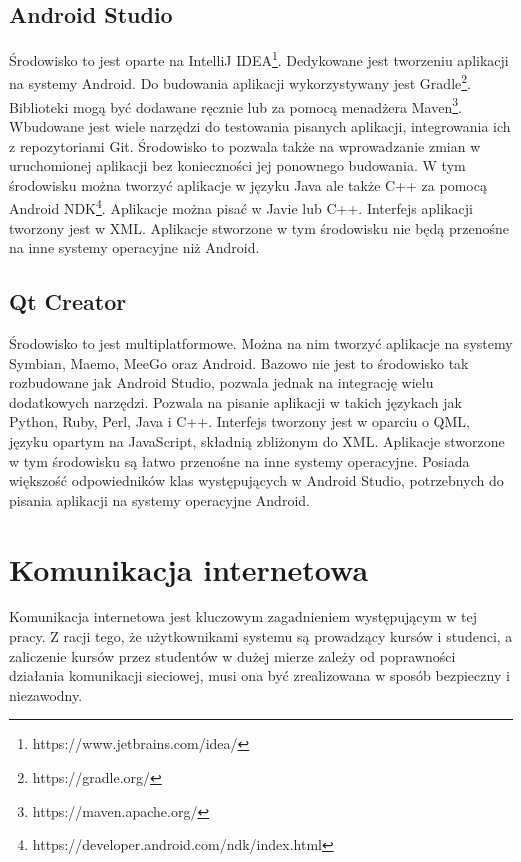 \documentclass[eng]{mgr}
\begin{document}
			\subsection{Android Studio}
			Środowisko to jest oparte na IntelliJ IDEA\footnote{https://www.jetbrains.com/idea/}. Dedykowane jest tworzeniu aplikacji na systemy Android. Do budowania aplikacji wykorzystywany jest Gradle\footnote{https://gradle.org/}. Biblioteki mogą być dodawane ręcznie lub za pomocą menadżera Maven\footnote{https://maven.apache.org/}. Wbudowane jest wiele narzędzi do testowania pisanych aplikacji, integrowania ich z repozytoriami Git. Środowisko to pozwala także na wprowadzanie zmian w uruchomionej aplikacji bez konieczności jej ponownego budowania. W tym środowisku można tworzyć aplikacje w języku Java ale także C++ za pomocą Android NDK\footnote{https://developer.android.com/ndk/index.html}. Aplikacje można pisać w Javie lub C++. Interfejs aplikacji tworzony jest w XML. Aplikacje stworzone w tym środowisku nie będą przenośne na inne systemy operacyjne niż Android.
			
			\subsection{Qt Creator}
			Środowisko to jest multiplatformowe. Można na nim tworzyć aplikacje na systemy Symbian, Maemo, MeeGo oraz Android. Bazowo nie jest to środowisko tak rozbudowane jak Android Studio, pozwala jednak na integrację wielu dodatkowych narzędzi. Pozwala na pisanie aplikacji w takich językach jak Python, Ruby, Perl, Java i C++. Interfejs tworzony jest w oparciu o QML, języku opartym na JavaScript, składnią zbliżonym do XML. Aplikacje stworzone w tym środowisku są łatwo przenośne na inne systemy operacyjne. Posiada większość odpowiedników klas występujących w Android Studio, potrzebnych do pisania aplikacji na systemy operacyjne Android.
	
		\section{Komunikacja internetowa}
		Komunikacja internetowa jest kluczowym zagadnieniem występującym w tej pracy. Z racji tego, że użytkownikami systemu są prowadzący kursów i studenci, a zaliczenie kursów przez studentów w dużej mierze zależy od poprawności działania komunikacji sieciowej, musi ona być zrealizowana w sposób bezpieczny i niezawodny.
		
\end{document}
